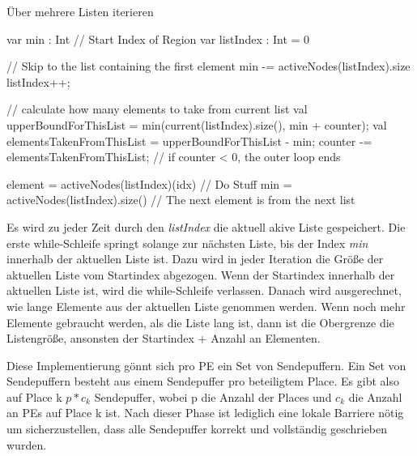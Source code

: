 \begin{algorithm}
	\caption{Über mehrere Listen iterieren}
	\label{alg:iterate_active_nodes}
	\begin{algorithmic}[1]
		\State var min : Int // Start Index of Region
		\State var listIndex : Int = 0

			// Skip to the list containing the first element
				\State min -= activeNodes(listIndex).size
				\State listIndex++;
			\EndWhile

			// calculate how many elements to take from current list
			\State val upperBoundForThisList = min(current(listIndex).size(), min + counter);
            \State val elementsTakenFromThisList = upperBoundForThisList - min;
            \State counter -= elementsTakenFromThisList; // if counter < 0, the outer loop ends

            	\State element = activeNodes(listIndex)(idx)
            	\State // Do Stuff
            \EndFor
            \State min = activeNodes(listIndex).size() // The next element is from the next list

		\EndFor
	\end{algorithmic}
\end{algorithm}
Es wird zu jeder Zeit durch den \textit{listIndex} die aktuell akive Liste gespeichert. Die erste while-Schleife springt solange zur nächsten Liste, bis der Index \textit{min} innerhalb der aktuellen Liste ist. Dazu wird in jeder Iteration die Größe der aktuellen Liste vom Startindex abgezogen. Wenn der Startindex innerhalb der aktuellen Liste ist, wird die while-Schleife verlassen. Danach wird ausgerechnet, wie lange Elemente aus der aktuellen Liste genommen werden. Wenn noch mehr Elemente gebraucht werden, als die Liste lang ist, dann ist die Obergrenze die Listengröße, ansonsten der Startindex + Anzahl an Elementen.

Diese Implementierung gönnt sich pro PE ein Set von Sendepuffern. Ein Set von Sendepuffern besteht aus einem Sendepuffer pro beteiligtem Place. Es gibt also auf Place k $p * c_k$ Sendepuffer, wobei p die Anzahl der Places und $c_k$ die Anzahl an PEs auf Place k ist. Nach dieser Phase ist lediglich eine lokale Barriere nötig um sicherzustellen, dass alle Sendepuffer korrekt und vollständig geschrieben wurden. 

